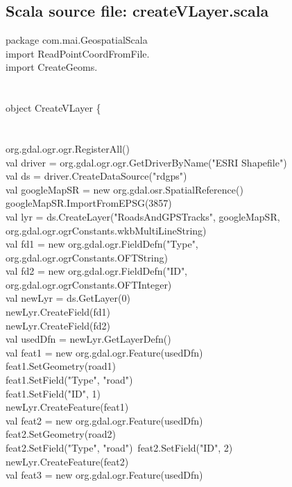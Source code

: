 \documentclass {article}
\begin{document}
\begin{appendices}
\section {Scala source file: createVLayer.scala}
package com.mai.GeospatialScala\\

import ReadPointCoordFromFile.\underline{\space}\\
import CreateGeoms.\underline{\space}\\
\\
\\
object CreateVLayer \{ \\
\\
\\
org.gdal.ogr.ogr.RegisterAll()\\
val driver = org.gdal.ogr.ogr.GetDriverByName("ESRI Shapefile")\\
val ds = driver.CreateDataSource("rdgps")\\
val googleMapSR = new org.gdal.osr.SpatialReference()\\
googleMapSR.ImportFromEPSG(3857)\\
val lyr = ds.CreateLayer("RoadsAndGPSTracks", googleMapSR, org.gdal.ogr.ogrConstants.wkbMultiLineString)\\
val fd1 = new org.gdal.ogr.FieldDefn("Type", org.gdal.ogr.ogrConstants.OFTString)\\
val fd2 = new org.gdal.ogr.FieldDefn("ID", org.gdal.ogr.ogrConstants.OFTInteger)\\
val newLyr = ds.GetLayer(0)\\
newLyr.CreateField(fd1)\\
newLyr.CreateField(fd2)\\
val usedDfn = newLyr.GetLayerDefn()\\
val feat1 = new org.gdal.ogr.Feature(usedDfn)\\
feat1.SetGeometry(road1)\\
feat1.SetField("Type", "road")\\
feat1.SetField("ID", 1)\\
newLyr.CreateFeature(feat1)\\
val feat2 = new org.gdal.ogr.Feature(usedDfn)\\
feat2.SetGeometry(road2)\\
feat2.SetField("Type", "road")\
feat2.SetField("ID", 2)\\
newLyr.CreateFeature(feat2)\\
val feat3 = new org.gdal.ogr.Feature(usedDfn)\\

\end{appendices}
\end{document}
